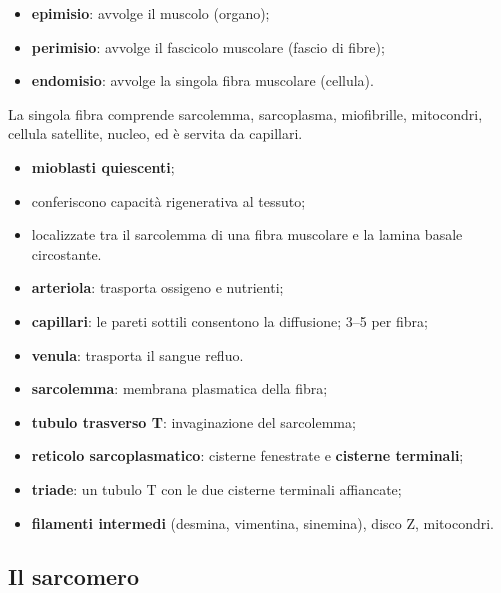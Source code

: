 \begin{itemize}
  \item \textbf{epimisio}: avvolge il muscolo (organo);
  \item \textbf{perimisio}: avvolge il fascicolo muscolare (fascio di fibre);
  \item \textbf{endomisio}: avvolge la singola fibra muscolare (cellula).
\end{itemize}
La singola fibra comprende sarcolemma, sarcoplasma, miofibrille, mitocondri, cellula satellite, nucleo, ed è servita da capillari.

\begin{itemize}
  \item \textbf{mioblasti quiescenti};
  \item conferiscono capacità rigenerativa al tessuto;
  \item localizzate tra il sarcolemma di una fibra muscolare e la lamina basale circostante.
\end{itemize}

\begin{itemize}
  \item \textbf{arteriola}: trasporta ossigeno e nutrienti;
  \item \textbf{capillari}: le pareti sottili consentono la diffusione; 3--5 per fibra;
  \item \textbf{venula}: trasporta il sangue refluo.
\end{itemize}

\begin{itemize}
  \item \textbf{sarcolemma}: membrana plasmatica della fibra;
  \item \textbf{tubulo trasverso T}: invaginazione del sarcolemma;
  \item \textbf{reticolo sarcoplasmatico}: cisterne fenestrate e \textbf{cisterne terminali};
  \item \textbf{triade}: un tubulo T con le due cisterne terminali affiancate;
  \item \textbf{filamenti intermedi} (desmina, vimentina, sinemina), disco Z, mitocondri.
\end{itemize}

\subsection{Il sarcomero}

